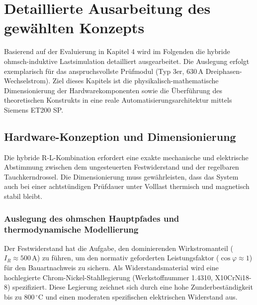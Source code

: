 \section{Detaillierte Ausarbeitung des gewählten Konzepts}
\label{chap:ausarbeitung}

Basierend auf der Evaluierung in Kapitel 4 wird im Folgenden die hybride ohmsch-induktive Lastsimulation detailliert ausgearbeitet. Die Auslegung erfolgt exemplarisch für das anspruchsvollste Prüfmodul (Typ 3er, 630\,A Dreiphasen-Wechselstrom). Ziel dieses Kapitels ist die physikalisch-mathematische Dimensionierung der Hardwarekomponenten sowie die Überführung des theoretischen Konstrukts in eine reale Automatisierungsarchitektur mittels Siemens ET200 SP.

\subsection{Hardware-Konzeption und Dimensionierung}
\label{sec:hardware_konzeption}

Die hybride R-L-Kombination erfordert eine exakte mechanische und elektrische Abstimmung zwischen dem ungesteuerten Festwiderstand und der regelbaren Tauchkerndrossel. Die Dimensionierung muss gewährleisten, dass das System auch bei einer achtstündigen Prüfdauer unter Volllast thermisch und magnetisch stabil bleibt.

\subsubsection{Auslegung des ohmschen Hauptpfades und thermodynamische Modellierung}
\label{sec:auslegung_widerstand}

Der Festwiderstand hat die Aufgabe, den dominierenden Wirkstromanteil ($I_R \approx 500\,\text{A}$) zu führen, um den normativ geforderten Leistungsfaktor ($\cos\varphi \approx 1$) für den Bauartnachweis zu sichern. Als Widerstandsmaterial wird eine hochlegierte Chrom-Nickel-Stahllegierung (Werkstoffnummer 1.4310, X10CrNi18-8) spezifiziert. Diese Legierung zeichnet sich durch eine hohe Zunderbeständigkeit bis zu $800\,^\circ\text{C}$ und einen moderaten spezifischen elektrischen Widerstand aus.

